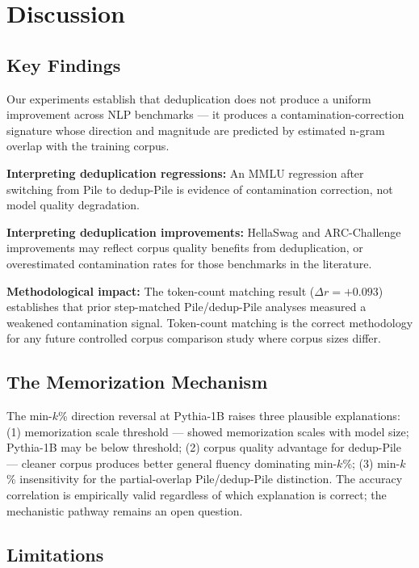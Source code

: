 \section{Discussion}
\label{sec:discussion}

\subsection{Key Findings}

Our experiments establish that deduplication does not produce a uniform improvement
across NLP benchmarks --- it produces a contamination-correction signature whose direction
and magnitude are predicted by estimated n-gram overlap with the training corpus.

\textbf{Interpreting deduplication regressions:} An MMLU regression after switching from
Pile to dedup-Pile is evidence of contamination correction, not model quality degradation.

\textbf{Interpreting deduplication improvements:} HellaSwag and ARC-Challenge improvements
may reflect corpus quality benefits from deduplication, or overestimated contamination
rates for those benchmarks in the literature.

\textbf{Methodological impact:} The token-count matching result ($\Delta r = +0.093$) establishes that prior
step-matched Pile/dedup-Pile analyses measured a weakened contamination signal.
Token-count matching is the correct methodology for any future controlled corpus
comparison study where corpus sizes differ.

\subsection{The Memorization Mechanism}

The min-$k$\% direction reversal at Pythia-1B raises three plausible explanations:
(1) memorization scale threshold --- \citet{Carlini2021Extracting} showed memorization scales
with model size; Pythia-1B may be below threshold; (2) corpus quality advantage for
dedup-Pile --- cleaner corpus produces better general fluency dominating min-$k$\%;
(3) min-$k$\% insensitivity for the partial-overlap Pile/dedup-Pile distinction.
The accuracy correlation is empirically valid regardless of which explanation
is correct; the mechanistic pathway remains an open question.

\subsection{Limitations}


